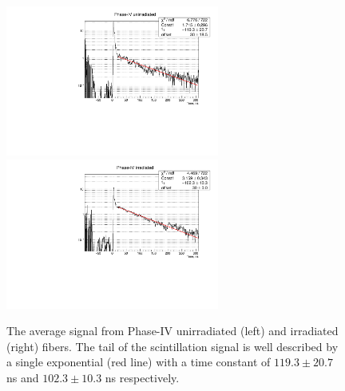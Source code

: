 \documentclass[a4paper,11pt]{article}
\begin{document}
\begin{figure}[ht]
\begin{center}
      \includegraphics[width=7cm]{Figures/B5_R11864_fit_zoom_singleLog.pdf}
      \includegraphics[width=7cm]{Figures/B4_R11863_fit_zoom_singleLog.pdf}
\caption{\small The average signal from Phase-IV unirradiated (left) and irradiated (right) fibers. The tail of the scintillation signal is well described by a single exponential (red line) with a time constant of $119.3 \pm 20.7$ ns and $102.3 \pm 10.3$ ns respectively.}
    \label{fig:phase4scintTime}
\end{center}
\end{figure}



\end{document}
